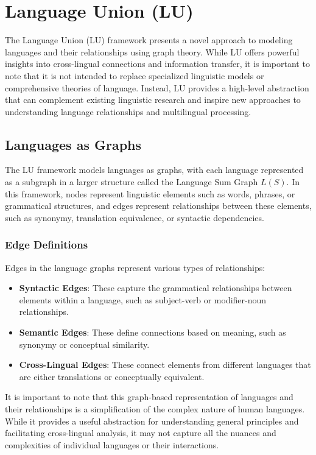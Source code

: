 \section{Language Union (LU)}

The Language Union (LU) framework presents a novel approach to modeling languages and their relationships using graph theory. While LU offers powerful insights into cross-lingual connections and information transfer, it is important to note that it is not intended to replace specialized linguistic models or comprehensive theories of language. Instead, LU provides a high-level abstraction that can complement existing linguistic research and inspire new approaches to understanding language relationships and multilingual processing.

\subsection{Languages as Graphs}

The LU framework models languages as graphs, with each language represented as a subgraph in a larger structure called the Language Sum Graph $L(S)$. In this framework, nodes represent linguistic elements such as words, phrases, or grammatical structures, and edges represent relationships between these elements, such as synonymy, translation equivalence, or syntactic dependencies.

\subsubsection{Edge Definitions}

Edges in the language graphs represent various types of relationships:

\begin{itemize}
    \item \textbf{Syntactic Edges}: These capture the grammatical relationships between elements within a language, such as subject-verb or modifier-noun relationships.
    \item \textbf{Semantic Edges}: These define connections based on meaning, such as synonymy or conceptual similarity.
    \item \textbf{Cross-Lingual Edges}: These connect elements from different languages that are either translations or conceptually equivalent.
\end{itemize}

It is important to note that this graph-based representation of languages and their relationships is a simplification of the complex nature of human languages. While it provides a useful abstraction for understanding general principles and facilitating cross-lingual analysis, it may not capture all the nuances and complexities of individual languages or their interactions.

